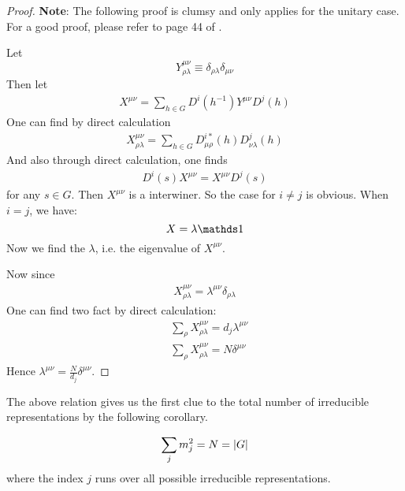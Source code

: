 \begin{proof}
    \textbf{Note}: The following proof is clumsy and only applies for
    the unitary case. For a good proof, please refer to page 44 of
    \cite{Ludeling}.

    Let
    \begin{equation}
        Y_{\rho\lambda}^{\mu\nu} \equiv
        \delta_{\rho\lambda}\delta_{\mu\nu}
    \end{equation}
    Then let
    \begin{align*}
        X^{\mu\nu} = \sum_{h\in G} D^i(h^{-1}) Y^{\mu\nu} D^j(h)
    \end{align*}
    One can find by direct calculation
    \begin{align}
        X^{\mu\nu}_{\rho\lambda}= \sum_{h\in G}
        D^{i*}_{\mu\rho}(h)D^j_{\nu \lambda}(h)
    \end{align}
    And also through direct calculation, one finds
    \begin{align*}
        D^i (s) X^{\mu\nu} = X^{\mu\nu} D^j(s)
    \end{align*}
    for any $s\in G$. 
    Then $X^{\mu\nu}$ is a interwiner. So the case for $i\neq j$ is
    obvious. When $i=j$, we have:
    $$ X = \lambda \id$$
    Now we find the $\lambda$, i.e. the eigenvalue of $X^{\mu\nu}$.
    
    Now since
    \begin{align*}
        X^{\mu\nu}_{\rho\lambda} = \lambda^{\mu\nu}
        \delta_{\rho\lambda}
    \end{align*}
    One can find two fact by direct calculation:
    \begin{align*}
        &\sum_\rho X^{\mu\nu}_{\rho\lambda} = d_j \lambda^{\mu\nu} \\
        &\sum_\rho X^{\mu\nu}_{\rho\lambda} = N \delta^{\mu\nu}
    \end{align*}
    Hence $\lambda^{\mu\nu} = \frac{N}{d_j} \delta^{\mu\nu}$.
\end{proof}
The above relation gives us the first clue to the total number of
irreducible representations by the following corollary. 
\begin{coro}
    \begin{equation}
        \sum_{j} m_j^2 = N = \abs{G}
    \end{equation}
    where the index $j$ runs over all possible irreducible
    representations.
\end{coro}

